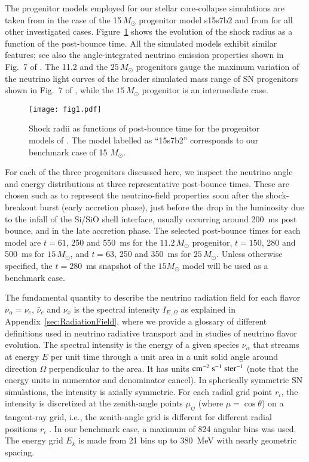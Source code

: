 \documentclass[iop,twocolappendix,numberedappendix]{emulateapj}
\begin{document}
The progenitor models employed for our stellar core-collapse
simulations are taken from \cite{Woosley:1995ip} in the case of the
15\,$M_\odot$ progenitor model s15s7b2 and from \cite{Woosleyetal2002}
for all other investigated cases.
Figure~\ref{fig:shockradii} shows the evolution of the shock radius as a
function of the post-bounce time. All the simulated models exhibit similar
features; see also the angle-integrated neutrino emission properties shown in
Fig.~7 of \cite{Janka:2012sb}. The 11.2 and the $25\,M_\odot$ progenitors
gauge the maximum variation of the neutrino light curves of the broader
simulated mass range of SN progenitors shown in Fig.~7 of
\cite{Janka:2012sb}, while the $15\,M_\odot$ progenitor is an intermediate
case.

\begin{figure}
\texttt{[image: fig1.pdf]}
\caption{Shock radii as functions of post-bounce time for the progenitor
models of \cite{Huedepohl:2013}. The model labelled as ``15s7b2'' 
corresponds to our benchmark case of 15 $M_\odot$.}
\label{fig:shockradii}
\end{figure}

For each of the three progenitors discussed here, we inspect the neutrino
angle and
energy distributions at three representative post-bounce times. These are
chosen such as to represent the neutrino-field properties soon after the
shock-breakout burst (early accretion phase), just before the drop in the
luminosity due to the infall of the Si/SiO shell interface, usually occurring
around 200~ms post bounce, and in the late accretion phase. The selected
post-bounce times for each model are $t = 61$, 250 and 550~ms for the
$11.2\,M_\odot$ progenitor, $t = 150$, 280 and 500~ms for $15\,M_\odot$, and
$t = 63$, 250 and 350~ms for $25\,M_\odot$. Unless otherwise specified, the
$t = 280$~ms snapshot of the $15 M_\odot$ model will be used as a benchmark
case.

The fundamental quantity to describe the neutrino radiation field for each
flavor $\nu_\alpha=\nu_e$, $\bar{\nu}_e$ and $\nu_x$ is the spectral
intensity $I_{E,\Omega}$ as explained in Appendix~\ref{sec:RadiationField},
where we provide a glossary of different definitions used in neutrino
radiative transport and in studies of neutrino flavor evolution. The spectral
intensity is the energy of a given species $\nu_\alpha$ that streams at
energy $E$ per unit time through a unit area in a unit solid angle around
direction $\Omega$ perpendicular to the area. It  
has units ${\rm cm}^{-2}~{\rm s}^{-1}~{\rm ster}^{-1}$ (note that the energy
units in numerator and denominator cancel). In spherically
symmetric SN simulations, the intensity is axially symmetric. For each
radial grid point $r_i$, the intensity is discretized at the zenith-angle points
$\mu_{ij}$ (where $\mu=\cos\theta$) on a tangent-ray grid, i.e., 
the zenith-angle grid is
different for different radial positions $r_i$ \citep{RamppJanka2002}. In our
benchmark case, a maximum of 824 angular bins was
used. The energy grid $E_k$ is made
from 21 bins up to 380~MeV with nearly geometric spacing.
\end{document}
